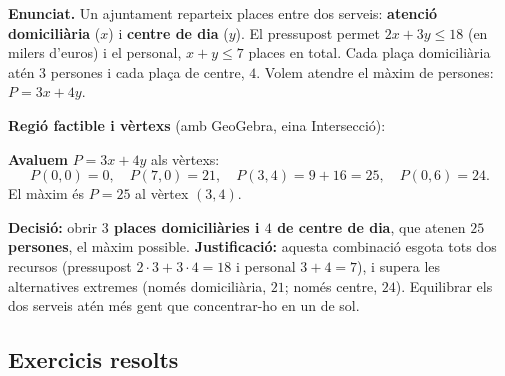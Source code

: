 \begin{exemple}
\textbf{Enunciat.} Un ajuntament reparteix places entre dos serveis: \textbf{atenció
domiciliària} ($x$) i \textbf{centre de dia} ($y$). El pressupost permet
$2x+3y\le 18$ (en milers d'euros) i el personal, $x+y\le 7$ places en total. Cada
plaça domiciliària atén $3$ persones i cada plaça de centre, $4$. Volem atendre el
màxim de persones: $P=3x+4y$.

\textbf{Regió factible i vèrtexs} (amb GeoGebra, eina Intersecció):

\begin{center}
\end{center}

\textbf{Avaluem} $P=3x+4y$ als vèrtexs:
\[
P(0,0)=0,\quad P(7,0)=21,\quad P(3,4)=9+16=25,\quad P(0,6)=24.
\]
El màxim és $P=25$ al vèrtex $(3,4)$.
\end{exemple}

\begin{exemple}
\textbf{Decisió:} obrir \textbf{$3$ places domiciliàries i $4$ de centre de dia}, que
atenen \textbf{$25$ persones}, el màxim possible. \textbf{Justificació:} aquesta
combinació esgota tots dos recursos (pressupost $2\cdot 3+3\cdot 4=18$ i personal
$3+4=7$), i supera les alternatives extremes (només domiciliària, $21$; només centre,
$24$). Equilibrar els dos serveis atén més gent que concentrar-ho en un de sol.
\end{exemple}

\subsection{Exercicis resolts}

